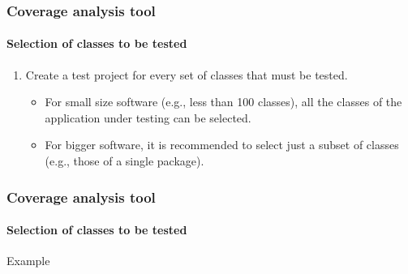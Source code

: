 \begin{frame}[parent={cmap:coverage-analysis-tool},hasnext=true,hasprev=true]
\frametitle{Coverage analysis tool}
\framesubtitle{Selection of classes to be tested}

\begin{block:procedure}{}
\begin{enumerate}
	\item Create a test project for every set of classes that must be tested.
	\begin{itemize}
		\item For small size software (e.g., less than 100 classes), all the
		classes of the application under testing can be selected.

		\item For bigger software, it is recommended to select just a subset
		of classes (e.g., those of a single package).
	\end{itemize}
\end{enumerate}
\end{block:procedure}
\end{frame}


\begin{frame}
\frametitle{Coverage analysis tool}
\framesubtitle{Selection of classes to be tested}

\begin{block}{Example}
\end{block}
\end{frame}

